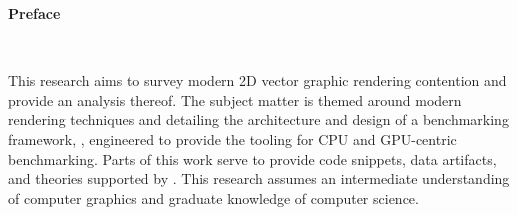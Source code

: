 \vspace*{0.5in}
\begin{center}
    \textbf{Preface}\label{sec:preface}\\[2ex]
\end{center}

\begin{doublespace}
This research aims to survey modern 2D vector graphic rendering contention and provide an analysis thereof. The subject matter is themed around modern rendering techniques and detailing the architecture and design of a benchmarking framework, \textit{\toolname}, engineered to provide the tooling for CPU and GPU-centric benchmarking. Parts of this work serve to provide code snippets, data artifacts, and theories supported by \textit{\toolname}. This research assumes an intermediate understanding of computer graphics and graduate knowledge of computer science.
\end{doublespace}